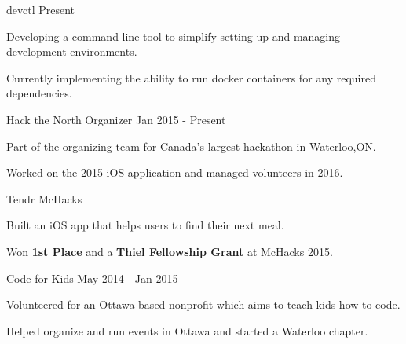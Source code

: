 

\begin{cventries}

  \cvprojectentry
    {devctl} %
    {Present}
    {
      \begin{cvitems} %
        \item {Developing a command line tool to simplify setting up and managing development environments.}
        \item {Currently implementing the ability to run docker containers for any required dependencies.}
      \end{cvitems}
    }

  \cvprojectentry
	{Hack the North Organizer}    
	{Jan 2015 - Present}
    {
      \begin{cvitems} %
        \item {Part of the organizing team for Canada's largest hackathon in Waterloo,ON.}
        \item {Worked on the 2015 iOS application and managed volunteers in 2016.}
      \end{cvitems}
    }

  \cvprojectentry
    {Tendr} %
    {McHacks}
    {
      \begin{cvitems} %
        \item {Built an iOS app that helps users to find their next meal.}
        \item {Won \textbf{1st Place} and a \textbf{Thiel Fellowship Grant} at McHacks 2015.}
      \end{cvitems}
    }

  \cvprojectentry
    {Code for Kids} %
    {May 2014 - Jan 2015}
    {
      \begin{cvitems} %
        \item {Volunteered for an Ottawa based nonprofit which aims to teach kids how to code.}
        \item {Helped organize and run events in Ottawa and started a Waterloo chapter.}
      \end{cvitems}
    }
  

\end{cventries}
